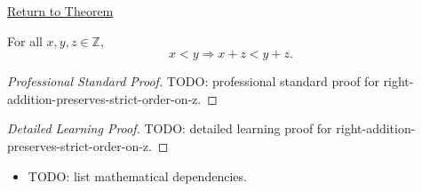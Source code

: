 \newpage
{}
\label{prf:right-addition-preserves-strict-order-on-z}

\begin{remark*}[Return]
\hyperref[cor:right-addition-preserves-strict-order-on-z]{Return to Theorem}
\end{remark*}

\begin{corollary*}
For all $x,y,z\in\mathbb{Z}$,
\[
x<y \Longrightarrow x+z<y+z.
\]
\end{corollary*}

\begin{proof}[Professional Standard Proof]
\LRAProofBodyStart
TODO: professional standard proof for right-addition-preserves-strict-order-on-z.
\end{proof}

\begin{proof}[Detailed Learning Proof]
\LRAProofBodyStart
TODO: detailed learning proof for right-addition-preserves-strict-order-on-z.
\end{proof}

\begin{remark*}
\end{remark*}

\begin{dependencies}
\begin{itemize}
  \item TODO: list mathematical dependencies.
\end{itemize}
\end{dependencies}

\clearpage
